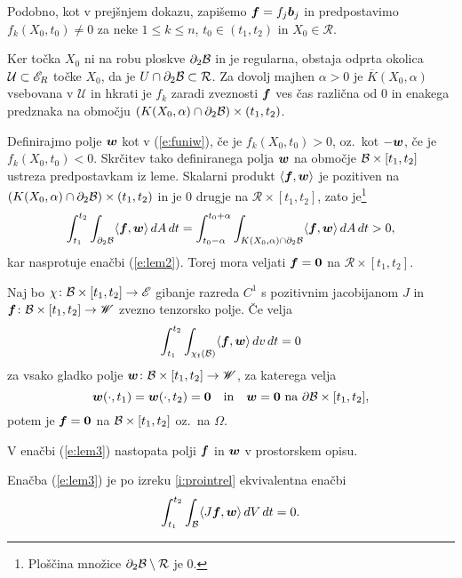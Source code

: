 \proof
	Podobno, kot v prejšnjem dokazu, zapišemo $\boldsymbol f=f_j\boldsymbol b_j$ in predpostavimo
	$f_{k}(X_0,t_0)\neq 0$ za neke $1\leq k\leq n$, $t_0\in (t_1,t_2)$ in $X_0\in \mathcal{R}$.
	
	Ker točka $X_0$ ni na robu ploskve $\partial_2 \mathcal B$ in je regularna, obstaja odprta okolica $\mathcal{U}\subset\mathscr E_R$ točke
	$X_0$, da je $U\cap\partial_2\mathcal B\subset\mathcal{R}$.
	Za dovolj majhen $\alpha>0$ je $\overline{K}(X_0,\alpha)$ vsebovana v $\mathcal{U}$ in
	hkrati je $f_k$ zaradi zveznosti $\boldsymbol f$ ves čas različna od 0 in enakega predznaka
	na območju $(K(X_0,\alpha)\cap\partial_2\mathcal B)\times(t_1,t_2)$.
	
	Definirajmo polje $\boldsymbol w$ kot v
	(\ref{e:funiw}), če je $f_{k}(X_0,t_0) > 0$, oz.~kot $-\boldsymbol w$,
	če je $f_{k}(X_0,t_0) < 0$. Skrčitev tako definiranega polja $\boldsymbol w$ na območje
	$\mathcal B\times[t_1,t_2]$ ustreza predpostavkam iz leme.
	Skalarni produkt $\langle\boldsymbol f,\boldsymbol w\rangle$ je pozitiven na
	$(K(X_0,\alpha)\cap\partial_2\mathcal B)\times(t_1,t_2)$ in je 0 drugje na $\mathcal{R}\times[t_1,t_2]$,
	zato je\footnote{Ploščina množice $\partial_2\mathcal B\setminus \mathcal{R}$ je 0.}
	\[
		\int_{t_1}^{t_2}\int_{\partial_2\mathcal B} \langle\boldsymbol f,\boldsymbol w\rangle\,dA\,dt=
		\int_{t_0-\alpha}^{t_0+\alpha}\int_{K(X_0,\alpha)\cap\partial_2\mathcal B} \langle\boldsymbol f,\boldsymbol w\rangle\,dA\,dt> 0,
	\]
	kar nasprotuje enačbi (\ref{e:lem2}). Torej mora veljati $\boldsymbol f=\boldsymbol 0$ na
	$\mathcal{R}\times [t_1,t_2]$.
\endproof

\begin{lema} \label{lema3}
	Naj bo $\chi\colon \mathcal B\times[t_1,t_2]\to\mathscr E$ gibanje razreda $C^1$ s pozitivnim jacobijanom $J$ in
	$\boldsymbol f\colon \mathcal B\times[t_1,t_2]\to\mathscr W$ zvezno tenzorsko polje. Če velja
	\begin{equation} \label{e:lem3}
		\int_{t_1}^{t_2}\int_{\chi_t(\mathcal B)}\langle\boldsymbol f,\boldsymbol w\rangle \,dv\,dt=0
	\end{equation}
	za vsako gladko polje $\boldsymbol w\colon \mathcal B\times[t_1,t_2]\to\mathscr W$, za katerega velja
	\[
		\boldsymbol w(\cdot,t_1)=\boldsymbol w(\cdot,t_2)=\boldsymbol 0\quad\textrm{in}
		\quad\boldsymbol w=\boldsymbol 0\ \textrm{na}\ \partial \mathcal B\times[t_1,t_2],
	\]
	potem je $\boldsymbol f=\boldsymbol 0$ na $\mathcal B\times[t_1,t_2]$ oz.~na $\Omega$.
\end{lema}
V enačbi (\ref{e:lem3}) nastopata polji $\boldsymbol f$ in $\boldsymbol w$ v prostorskem opisu.

\proof
	Enačba (\ref{e:lem3}) je po izreku \ref{i:prointrel} ekvivalentna enačbi
	\[ \int_{t_1}^{t_2}\int_{\mathcal B}\langle J\boldsymbol f,\boldsymbol w\rangle \,dV\,dt=0. \]
	
